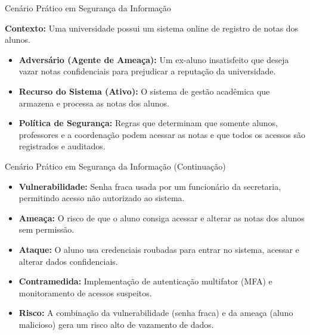 \begin{frame}{Cenário Prático em Segurança da Informação}

\textbf{Contexto:} Uma universidade possui um sistema online de registro de notas dos alunos.

\vspace{0.3cm}

\begin{itemize}
  \item \textbf{Adversário (Agente de Ameaça):}  
  Um ex-aluno insatisfeito que deseja vazar notas confidenciais para prejudicar a reputação da universidade.

  \item \textbf{Recurso do Sistema (Ativo):}  
  O sistema de gestão acadêmica que armazena e processa as notas dos alunos.

  \item \textbf{Política de Segurança:}  
  Regras que determinam que somente alunos, professores e a coordenação podem acessar as notas e que todos os acessos são registrados e auditados.
  \end{itemize}
\end{frame}
\begin{frame}{Cenário Prático em Segurança da Informação (Continuação)}
\begin{itemize}
    \item \textbf{Vulnerabilidade:}  
  Senha fraca usada por um funcionário da secretaria, permitindo acesso não autorizado ao sistema.

  \item \textbf{Ameaça:}  
  O risco de que o aluno consiga acessar e alterar as notas dos alunos sem permissão.

  \item \textbf{Ataque:}  
  O aluno usa credenciais roubadas para entrar no sistema, acessar e alterar dados confidenciais.

  \item \textbf{Contramedida:}  
  Implementação de autenticação multifator (MFA) e monitoramento de acessos suspeitos.

  \item \textbf{Risco:}  
  A combinação da vulnerabilidade (senha fraca) e da ameaça (aluno malicioso) gera um risco alto de vazamento de dados.
\end{itemize}

\end{frame}


